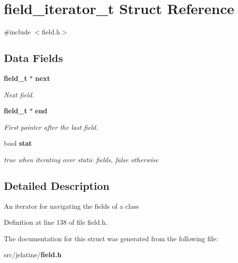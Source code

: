 \section{field\_\-iterator\_\-t Struct Reference}
\label{structfield__iterator__t}


{\ttfamily \#include $<$field.h$>$}

\subsection*{Data Fields}
\begin{DoxyCompactItemize}
\item 
{\bf field\_\-t} $\ast$ {\bf next}\label{structfield__iterator__t_ac9d28bb93ebe1d10a9520f89625ecab1}

\begin{DoxyCompactList}\small\item\em Next field. \item\end{DoxyCompactList}\item 
{\bf field\_\-t} $\ast$ {\bf end}\label{structfield__iterator__t_a697ad4aa131b31171a3a9ae7408b2701}

\begin{DoxyCompactList}\small\item\em First pointer after the last field. \item\end{DoxyCompactList}\item 
bool {\bf stat}\label{structfield__iterator__t_abdc97b870f2961808c074dc81ac6758c}

\begin{DoxyCompactList}\small\item\em true when iterating over static fields, false otherwise \item\end{DoxyCompactList}\end{DoxyCompactItemize}


\subsection{Detailed Description}
An iterator for navigating the fields of a class 

Definition at line 138 of file field.h.



The documentation for this struct was generated from the following file:\begin{DoxyCompactItemize}
\item 
src/jelatine/{\bf field.h}\end{DoxyCompactItemize}
